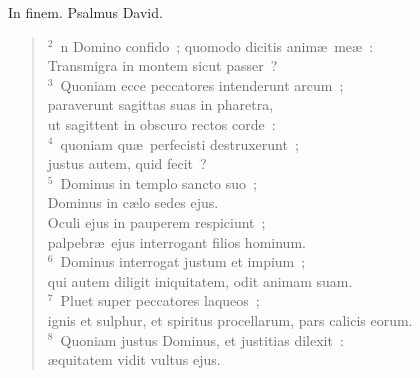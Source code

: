 \bchapter[Psalm]
In finem. Psalmus David.
\begin{verse}${}^{2}$~n Domino confido~; quomodo dicitis anim\ae\ me\ae~:\\ Transmigra in montem sicut passer~?\\
${}^{3}$~Quoniam ecce peccatores intenderunt arcum~;\\ paraverunt sagittas suas in pharetra,\\ ut sagittent in obscuro rectos corde~:\\
${}^{4}$~quoniam qu\ae\ perfecisti destruxerunt~;\\ justus autem, quid fecit~?\\
${}^{5}$~Dominus in templo sancto suo~;\\ Dominus in c\ae lo sedes ejus.\\ Oculi ejus in pauperem respiciunt~;\\ palpebr\ae\ ejus interrogant filios hominum.\\
${}^{6}$~Dominus interrogat justum et impium~;\\ qui autem diligit iniquitatem, odit animam suam.\\
${}^{7}$~Pluet super peccatores laqueos~;\\ ignis et sulphur, et spiritus procellarum, pars calicis eorum.\\
${}^{8}$~Quoniam justus Dominus, et justitias dilexit~:\\ \ae quitatem vidit vultus ejus.\end{verse}



